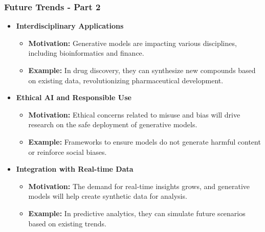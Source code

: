 \documentclass[aspectratio=169]{beamer}
\begin{document}
\begin{frame}[fragile]
    \frametitle{Future Trends - Part 2}
    \begin{itemize}
        \item \textbf{Interdisciplinary Applications}
            \begin{itemize}
                \item \textbf{Motivation:} Generative models are impacting various disciplines, including bioinformatics and finance.
                \item \textbf{Example:} In drug discovery, they can synthesize new compounds based on existing data, revolutionizing pharmaceutical development.
            \end{itemize}
        \item \textbf{Ethical AI and Responsible Use}
            \begin{itemize}
                \item \textbf{Motivation:} Ethical concerns related to misuse and bias will drive research on the safe deployment of generative models.
                \item \textbf{Example:} Frameworks to ensure models do not generate harmful content or reinforce social biases.
            \end{itemize}
        \item \textbf{Integration with Real-time Data}
            \begin{itemize}
                \item \textbf{Motivation:} The demand for real-time insights grows, and generative models will help create synthetic data for analysis.
                \item \textbf{Example:} In predictive analytics, they can simulate future scenarios based on existing trends.
            \end{itemize}
    \end{itemize}
\end{frame}
\end{document}

